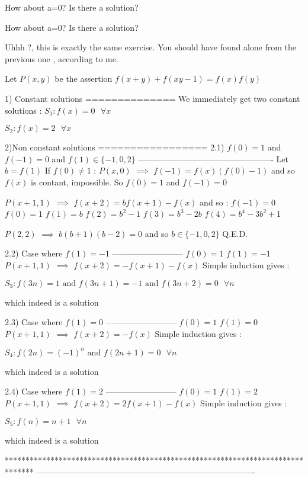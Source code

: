 \begin{solution}
	How about a=0? Is there a solution?
\end{solution}



\begin{solution}
	\begin{tcolorbox}How about a=0? Is there a solution?\end{tcolorbox}
Uhhh ?, this is exactly the same exercise. You should have found alone from the previous one , according to me.

Let $P(x,y)$ be the assertion $f(x+y)+f(xy-1)=f(x)f(y)$

1) Constant solutions
==============
We immediately get two constant solutions :
$\boxed{S_1 : f(x)=0\text{   }\forall x}$

$\boxed{S_2 : f(x)=2\text{   }\forall x}$

2)Non constant solutions
=================
2.1) $f(0)=1$ and $f(-1)=0$ and $f(1)\in \{-1,0,2\}$
-------------------------------------------------
Let $b=f(1)$
If $f(0)\ne 1$ : $P(x,0)$ $\implies$ $f(-1)=f(x)(f(0)-1)$ and so $f(x)$ is contant, impossible. So $f(0)=1$ and $f(-1)=0$

$P(x+1,1)$ $\implies$ $f(x+2)=bf(x+1)-f(x)$ and so :
$f(-1)=0$
$f(0)=1$
$f(1)=b$
$f(2)=b^2-1$
$f(3)=b^3-2b$
$f(4)=b^4-3b^2+1$

$P(2,2)$ $\implies$ $b(b+1)(b-2)=0$ and so $b\in\{-1,0,2\}$
Q.E.D.

2.2) Case where $f(1)=-1$ 
--------------------------
$f(0)=1$
$f(1)=-1$
$P(x+1,1)$ $\implies$ $f(x+2)=-f(x+1)-f(x)$
Simple induction gives :

$\boxed{S_3 : f(3n)=1\text{  and }f(3n+1)=-1\text{  and }f(3n+2)=0\text{  }\forall n}$

which indeed is a solution

2.3) Case where $f(1)=0$ 
--------------------------
$f(0)=1$
$f(1)=0$
$P(x+1,1)$ $\implies$ $f(x+2)=-f(x)$
Simple induction gives :

$\boxed{S_4 : f(2n)=(-1)^n\text{  and }f(2n+1)=0\text{  }\forall n}$

which indeed is a solution

2.4) Case where $f(1)=2$ 
--------------------------
$f(0)=1$
$f(1)=2$
$P(x+1,1)$ $\implies$ $f(x+2)=2f(x+1)-f(x)$
Simple induction gives :

$\boxed{S_5 : f(n)=n+1\text{  }\forall n}$

which indeed is a solution
\end{solution}
*******************************************************************************
-------------------------------------------------------------------------------

